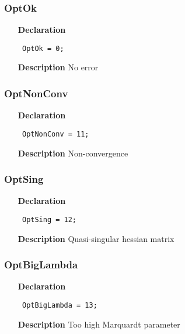 \documentclass[12pt,a4paper,oneside]{report}
\newcommand{\declarationitem}[1]{\textbf{#1}}
\newcommand{\descriptiontitle}[1]{\textbf{#1}}
\newcommand{\code}[1]{\texttt{#1}}
\begin{document}
\subsubsection{OptOk}
\label{uErrors-OptOk}
\begin{itemize}\item[\declarationitem{Declaration}\hfill]
	\begin{flushleft}
		\code{
			OptOk        = 0;}
		
	\end{flushleft}
	
	\par
	\item[\descriptiontitle{Description}]
	No error
	
\end{itemize}
\subsubsection{OptNonConv}
\label{uErrors-OptNonConv}
\begin{itemize}\item[\declarationitem{Declaration}\hfill]
	\begin{flushleft}
		\code{
			OptNonConv   = 11;}
		
	\end{flushleft}
	
	\par
	\item[\descriptiontitle{Description}]
	Non{-}convergence
	
\end{itemize}
\subsubsection{OptSing}
\label{uErrors-OptSing}
\begin{itemize}\item[\declarationitem{Declaration}\hfill]
	\begin{flushleft}
		\code{
			OptSing      = 12;}
		
	\end{flushleft}
	
	\par
	\item[\descriptiontitle{Description}]
	Quasi{-}singular hessian matrix
	
\end{itemize}
\subsubsection{OptBigLambda}
\label{uErrors-OptBigLambda}
\begin{itemize}\item[\declarationitem{Declaration}\hfill]
	\begin{flushleft}
		\code{
			OptBigLambda = 13;}
		
	\end{flushleft}
	
	\par
	\item[\descriptiontitle{Description}]
	Too high Marquardt parameter
	
\end{itemize}
\end{document}
